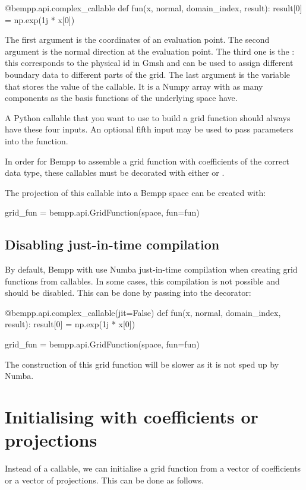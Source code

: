 \documentclass[a4paper]{book}
\begin{document}
\begin{python}
@bempp.api.complex_callable
def fun(x, normal, domain_index, result):
    result[0] = np.exp(1j * x[0])
\end{python}

The first argument  is the coordinates of an evaluation point.
The second argument  is the normal direction at the evaluation point.
The third one is the : this corresponds to the physical id in Gmsh and can be used to assign different boundary data to different parts of the grid.
The last argument  is the variable that stores the value of the callable.
It is a Numpy array with as many components as the basis functions of the underlying space have.

A Python callable that you want to use to build a grid function should always have these four inputs.
An optional fifth input may be used to pass parameters into the function.

In order for Bempp to assemble a grid function with coefficients of the correct data type,
these callables must be decorated with either  or
.

The projection of this callable into a Bempp space can be created with:
\begin{python}
grid_fun = bempp.api.GridFunction(space, fun=fun)
\end{python}

\subsection{ Disabling just-in-time compilation}By default, Bempp with use Numba just-in-time compilation when creating grid functions from callables.
In some cases, this compilation is not possible and should be disabled. This can be
done by passing  into the decorator:

\begin{python}
@bempp.api.complex_callable(jit=False)
def fun(x, normal, domain_index, result):
    result[0] = np.exp(1j * x[0])

grid_fun = bempp.api.GridFunction(space, fun=fun)
\end{python}

The construction of this grid function will be slower as it is not sped up by Numba.

\section{ Initialising with coefficients or projections}Instead of a callable, we can initialise a grid function from a vector of
coefficients or a vector of projections.
This can be done as follows.
\end{document}
